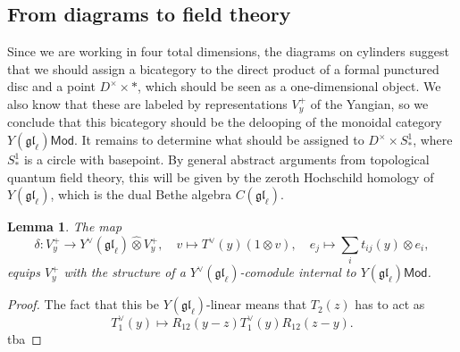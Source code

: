 \documentclass[11pt]{report}
\newtheorem{lemma}[theorem]{Lemma}
\theoremstyle{definition}
\theoremstyle{remark}
\theoremstyle{remark}
\newcommand{\Hom}{\operatorname{Hom}}
\begin{document}
\subsection{From diagrams to field theory}

Since we are working in four total dimensions, the diagrams on cylinders suggest that we should assign a bicategory to the direct product of a formal punctured disc and a point $D^\times \times *$, which should be seen as a one-dimensional object. We also know that these are labeled by representations $V_y^+$ of the Yangian, so we conclude that this bicategory should be the delooping of the monoidal category $Y(\mathfrak{gl}_\ell)\mathsf{Mod}$. It remains to determine what should be assigned to $D^\times \times S_*^1$, where $S_*^1$ is a circle with basepoint. By general abstract arguments from topological quantum field theory, this will be given by the zeroth Hochschild homology of $Y(\mathfrak{gl}_\ell)$, which is the dual Bethe algebra $C(\mathfrak{gl}_\ell)$.

\begin{lemma}
The map
\begin{equation*}
\delta: V_y^+ \to Y^\vee(\mathfrak{gl}_\ell) \operatorname{\widehat{\otimes}} V_y^+, \quad v \mapsto T^\vee(y) (1 \otimes v), \quad e_j \mapsto \sum_i t_{ij}(y) \otimes e_i,
\end{equation*}
equips $V_y^+$ with the structure of a $Y^\vee(\mathfrak{gl}_\ell)$-comodule internal to $Y(\mathfrak{gl}_\ell)\mathsf{Mod}$.
\end{lemma}

\begin{proof}
The fact that this be $Y(\mathfrak{gl}_\ell)$-linear means that $T_2(z)$ has to act as
\begin{equation*}
T_1^\vee(y) \mapsto R_{12}(y-z) T_1^\vee(y) R_{12}(z-y).
\end{equation*}
tba
\end{proof}
\end{document}
